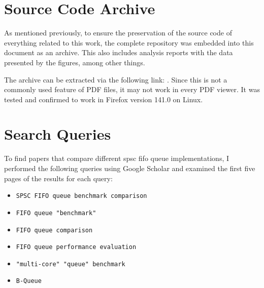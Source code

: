\chapter{Source Code Archive}
\label{app:source-code-archive}
As mentioned previously, to ensure the preservation of the source code of everything related to this work,
the complete repository was embedded into this document as an archive.
This also includes analysis reports with the data presented by the figures, among other things.

The archive can be extracted via the following link: .
Since this is not a commonly used feature of PDF files, it may not work in every PDF viewer.
It was tested and confirmed to work in Firefox version 141.0 on Linux.

\chapter{Search Queries}
\label{app:repro-search-queries}
To find papers that compare different \acrshort{spsc} \acrshort{fifo} queue implementations,
I performed the following queries using Google Scholar and examined the first five pages of the results for each query:
\begin{itemize}
    \item \texttt{SPSC FIFO queue benchmark comparison}
    \item \texttt{FIFO queue "benchmark"}
    \item \texttt{FIFO queue comparison}
    \item \texttt{FIFO queue performance evaluation}
    \item \texttt{"multi-core" "queue" benchmark}
    \item \texttt{B-Queue}
\end{itemize}

